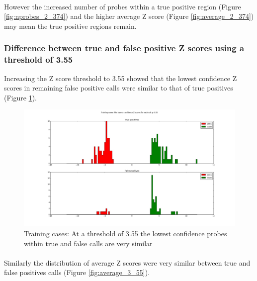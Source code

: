\paragraph*{}
However the increased number of probes within a true positive region (Figure \ref{fig:nprobes_2_374}) and the higher average Z score (Figure \ref{fig:average_2_374}) may mean the true positive regions remain.

\subsubsection{Difference between true and false positive Z scores using a threshold of 3.55}
Increasing the Z score threshold to 3.55 showed that the lowest confidence Z scores in remaining false positive calls were similar to that of true positives (Figure \ref{fig:lowest_3_55}).

\begin{figure}[h]
\centering
\includegraphics[width=1\linewidth]{./Figures/lowest_3_55}
\caption[Training cases: The lowest confidence probe within calls at a threshold of 3.55]{Training cases: At a threshold of 3.55 the lowest confidence probes within true and false calls are very similar}
\label{fig:lowest_3_55}
\end{figure}

\paragraph*{}
Similarly the distribution of average Z scores were very similar between true and false positives calls (Figure \ref{fig:average_3_55}).

